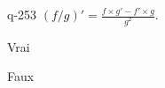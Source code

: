 \begin{truefalse}{q-253}
$(f / g)' = \frac{f\times g' - f'\times g}{g^2}$.
\item Vrai
\item* Faux
\end{truefalse}

